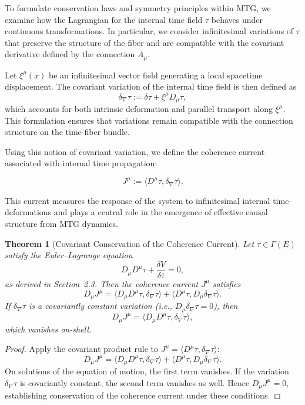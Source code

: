 \documentclass[11pt]{article}
\newtheorem{theorem}{Theorem}
\begin{document}
To formulate conservation laws and symmetry principles within MTG, we examine how the Lagrangian for the internal time field \( \tau \) behaves under continuous transformations. In particular, we consider infinitesimal variations of \( \tau \) that preserve the structure of the fiber and are compatible with the covariant derivative defined by the connection \( A_\mu \).

Let \( \xi^\mu(x) \) be an infinitesimal vector field generating a local spacetime displacement. The covariant variation of the internal time field is then defined as
\begin{equation}
\delta_\nabla \tau := \delta \tau + \xi^\mu D_\mu \tau,
\end{equation}
which accounts for both intrinsic deformation and parallel transport along \( \xi^\mu \). This formulation ensures that variations remain compatible with the connection structure on the time-fiber bundle.

Using this notion of covariant variation, we define the coherence current associated with internal time propagation:

\begin{equation}
J^\mu := \langle D^\mu \tau, \delta_\nabla \tau \rangle.
\end{equation}

This current measures the response of the system to infinitesimal internal time deformations and plays a central role in the emergence of effective causal structure from MTG dynamics.

\begin{theorem}[Covariant Conservation of the Coherence Current]
Let \( \tau \in \Gamma(E) \) satisfy the Euler--Lagrange equation
\[
D_\mu D^\mu \tau + \frac{\delta V}{\delta \bar{\tau}} = 0,
\]
as derived in Section~2.3. Then the coherence current \( J^\mu \) satisfies
\begin{equation}
D_\mu J^\mu = \langle D_\mu D^\mu \tau, \delta_\nabla \tau \rangle + \langle D^\mu \tau, D_\mu \delta_\nabla \tau \rangle.
\end{equation}
If \( \delta_\nabla \tau \) is a covariantly constant variation (i.e., \( D_\mu \delta_\nabla \tau = 0 \)), then
\begin{equation}
D_\mu J^\mu = \langle D_\mu D^\mu \tau, \delta_\nabla \tau \rangle,
\end{equation}
which vanishes on-shell.
\end{theorem}

\begin{proof}
Apply the covariant product rule to \( J^\mu = \langle D^\mu \tau, \delta_\nabla \tau \rangle \):
\begin{equation}
D_\mu J^\mu = \langle D_\mu D^\mu \tau, \delta_\nabla \tau \rangle + \langle D^\mu \tau, D_\mu \delta_\nabla \tau \rangle.
\end{equation}
On solutions of the equation of motion, the first term vanishes. If the variation \( \delta_\nabla \tau \) is covariantly constant, the second term vanishes as well. Hence \( D_\mu J^\mu = 0 \), establishing conservation of the coherence current under these conditions.
\end{proof}
\end{document}
